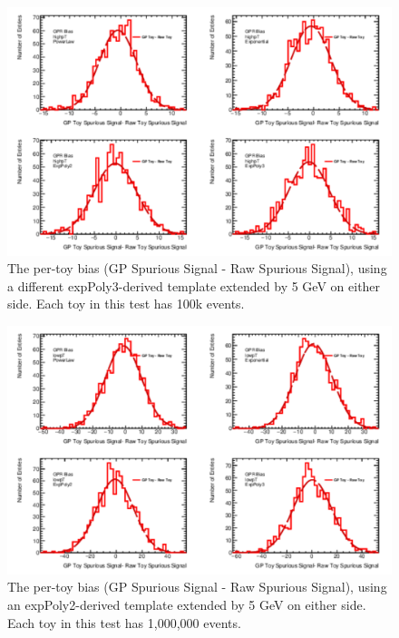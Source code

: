 \begin{figure} 
\begin{center}
  \includegraphics[width=\textwidth]{figures/background/gpr/validation/padded/ToyTest_FitSigBiases_highpT_100k_noSig}   
\caption{The per-toy bias (GP Spurious Signal - Raw Spurious Signal), using a different expPoly3-derived template extended by 5 GeV on either side. Each toy in this test has 100k events.}
\label{fig:bias_padded_highpt_100k_noSig}
\end{center}
\end{figure}

\begin{figure} 
\begin{center}
  \includegraphics[width=\textwidth]{figures/background/gpr/validation/padded/ToyTest_FitSigBiases_lowpT_1M_noSig}   
\caption{The per-toy bias (GP Spurious Signal - Raw Spurious Signal), using an expPoly2-derived template extended by 5 GeV on either side. Each toy in this test has 1,000,000 events.}
\label{fig:bias_padded_lowpt_1M_noSig}
\end{center}
\end{figure}

